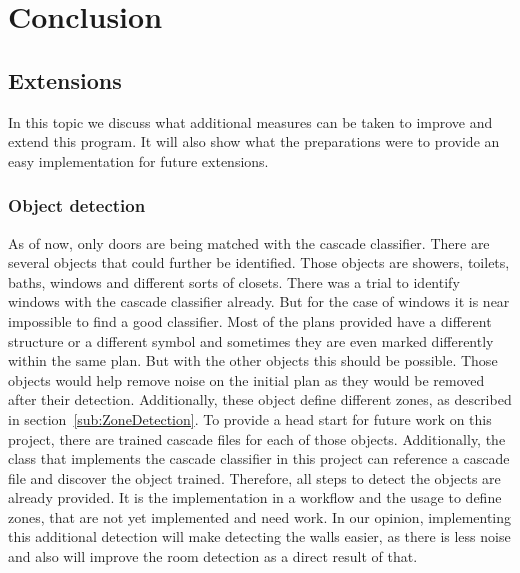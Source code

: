 \section{Conclusion}
\subsection{Extensions}
In this topic we discuss what additional measures can be taken to improve and extend this program. It will also show what the preparations were to provide an easy implementation for future extensions.

\subsubsection{Object detection}
\label{sub:FutureObjectDetection}
As of now, only doors are being matched with the cascade classifier. There are several objects that could further be identified. Those objects are showers, toilets, baths, windows and different sorts of closets.
There was a trial to identify windows with the cascade classifier already. But for the case of windows it is near impossible to find a good classifier. Most of the plans provided have a different structure or a different symbol and sometimes they are even marked differently within the same plan. But with the other objects this should be possible. Those objects would help remove noise on the initial plan as they would be removed after their detection. Additionally, these object define different zones, as described in section~\ref{sub:ZoneDetection}. To provide a head start for future work on this project, there are trained cascade files for each of those objects. Additionally, the class that implements the cascade classifier in this project can reference a cascade file and discover the object trained. Therefore, all steps to detect the objects are already provided. It is the implementation in a workflow and the usage to define zones, that are not yet implemented and need work. In our opinion, implementing this additional detection will make detecting the walls easier, as there is less noise and also will improve the room detection as a direct result of that.

